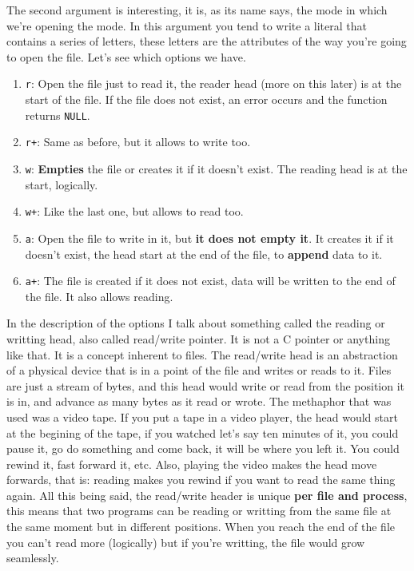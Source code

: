 \documentclass[a4paper]{article}
\begin{document}
The second argument is interesting, it is, as its name says, the mode in which
we're opening the mode. In this argument you tend to write a literal that
contains a series of letters, these letters are the attributes of the way you're
going to open the file. Let's see which options we have.
\begin{enumerate}
    \item \verb!r!: Open the file just to read it, the reader head (more on this
    later) is at the
    start of the file. If the file does not exist, an error occurs and the
    function returns \verb!NULL!.
    \item \verb!r+!: Same as before, but it allows to write too.
    \item \verb!w!: \textbf{Empties} the file or creates it if it doesn't exist.
    The reading head is at the start, logically.
    \item \verb!w+!: Like the last one, but allows to read too.
    \item \verb!a!: Open the file to write in it, but \textbf{it does not empty
    it}. It creates it if it doesn't exist, the head start at the end of the
    file, to \textbf{append} data to it.
    \item \verb!a+!: The file is created if it does not exist, data will be
    written to the end of the file. It also allows reading.
\end{enumerate}

In the description of the options I talk about something called the reading or
writting head, also called read/write pointer. It is not a C pointer or anything
like that. It is a concept inherent to files. The read/write head is an abstraction
of a physical device that is in a point of the file and writes or reads to it.
Files are just a stream of bytes, and this head would write or read from the
position it is in, and advance as many bytes as it read or wrote. The methaphor
that was used was a video tape. If you put a tape in a video player, the head
would start at the begining of the tape, if you watched let's say ten minutes
of it, you could pause it, go do something and come back, it will be where you
left it. You could rewind it, fast forward it, etc. Also, playing the video
makes the head move forwards, that is: reading makes you rewind if you want
to read the same thing again.
All this being said, the read/write header is unique \textbf{per
file and process}, this means that two programs can be reading or writting from
the same file at the same moment but in different positions.
When you reach the end of the file you can't
read more (logically) but if you're writting, the file would grow seamlessly.
\end{document}
